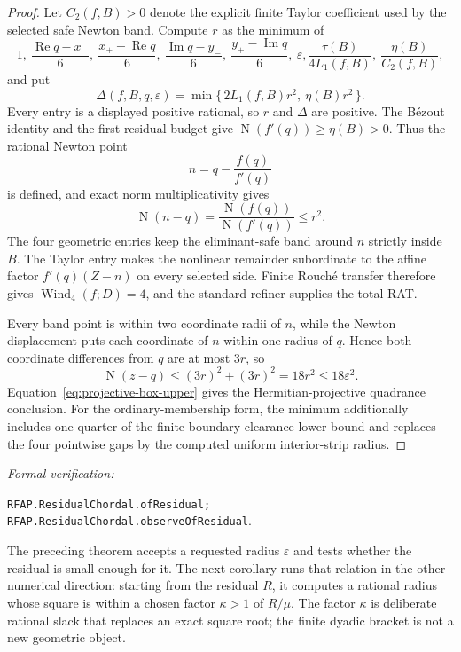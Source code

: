 \documentclass[11pt]{article}
\newcommand{\Norm}[1]{\operatorname{N}\!\left(#1\right)}
\newcommand{\Ree}{\operatorname{Re}}
\newcommand{\Imm}{\operatorname{Im}}
\newcommand{\Wind}{\operatorname{Wind}}
\newcommand{\eps}{\varepsilon}
\newcommand{\leanref}[1]{\par\smallskip\noindent
  \emph{Formal verification:}\par\nobreak
  {\raggedright\nolinkurl{#1}.\par}}
\begin{document}
\begin{proof}
Let $C_2(f,B)>0$ denote the explicit finite Taylor coefficient used by the
selected safe Newton band.  Compute $r$ as the minimum of
\[
 1,\ \frac{\Ree q-x_-}{6},\ \frac{x_+-\Ree q}{6},\
 \frac{\Imm q-y_-}{6},\ \frac{y_+-\Imm q}{6},\ \eps,
 \frac{\tau(B)}{4L_1(f,B)},\ \frac{\eta(B)}{C_2(f,B)},
\]
and put
\begin{equation}
\label{eq:residual-projective-target}
 \Delta(f,B,q,\eps)=
 \min\{\,2L_1(f,B)r^2,\ \eta(B) r^2\,\}.
\end{equation}
Every entry is a displayed positive rational, so $r$ and $\Delta$ are
positive.  The Bézout identity and the first residual budget give
$\Norm{f'(q)}\ge\eta(B)>0$.  Thus the rational Newton point
\[
                        n=q-\frac{f(q)}{f'(q)}
\]
is defined, and exact norm multiplicativity gives
\[
             \Norm{n-q}=\frac{\Norm{f(q)}}{\Norm{f'(q)}}\le r^2.
\]
The four geometric entries keep the eliminant-safe band around $n$ strictly
inside $B$.  The Taylor entry makes the nonlinear remainder subordinate to
the affine factor $f'(q)(Z-n)$ on every selected side.  Finite Rouché transfer
therefore gives $\Wind_4(f;D)=4$, and the standard refiner supplies the total
RAT.

Every band point is within two coordinate radii of $n$, while the Newton
displacement puts each coordinate of $n$ within one radius of $q$.  Hence
both coordinate differences from $q$ are at most $3r$, so
\[
             \Norm{z-q}\le(3r)^2+(3r)^2=18r^2\le18\eps^2.
\]
Equation~\eqref{eq:projective-box-upper} gives the Hermitian-projective
quadrance conclusion.  For the
ordinary-membership form, the minimum additionally includes one quarter of
the finite boundary-clearance lower bound and replaces the four pointwise
gaps by the computed uniform interior-strip radius.
\end{proof}

\leanref{RFAP.ResidualChordal.ofResidual;
RFAP.ResidualChordal.observeOfResidual}

The preceding theorem accepts a requested radius $\eps$ and tests whether the
residual is small enough for it.  The next corollary runs that relation in the
other numerical direction: starting from the residual $R$, it computes a
rational radius whose square is within a chosen factor $\kappa>1$ of
$R/\mu$.  The factor $\kappa$ is deliberate rational slack that replaces an
exact square root; the finite dyadic bracket is not a new geometric object.
\end{document}
